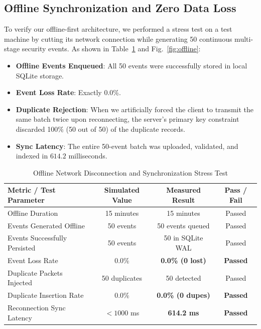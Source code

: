 \documentclass[conference]{IEEEtran}
\begin{document}
\subsection{Offline Synchronization and Zero Data Loss}
To verify our offline-first architecture, we performed a stress test on a test machine by cutting its network connection while generating 50 continuous multi-stage security events. 
As shown in Table~\ref{tab:offline_results} and Fig.~\ref{fig:offline}:
\begin{itemize}
    \item \textbf{Offline Events Enqueued}: All 50 events were successfully stored in local SQLite storage.
    \item \textbf{Event Loss Rate}: Exactly 0.0\%.
    \item \textbf{Duplicate Rejection}: When we artificially forced the client to transmit the same batch twice upon reconnecting, the server's primary key constraint discarded 100\% (50 out of 50) of the duplicate records.
    \item \textbf{Sync Latency}: The entire 50-event batch was uploaded, validated, and indexed in $614.2$ milliseconds.
\end{itemize}

\begin{table}[h]
\caption{Offline Network Disconnection and Synchronization Stress Test}
\label{tab:offline_results}
\centering
\begin{tabular}{@{}lccc@{}}
\toprule
\textbf{Metric / Test Parameter} & \textbf{Simulated Value} & \textbf{Measured Result} & \textbf{Pass / Fail} \\
\midrule
Offline Duration & 15 minutes & 15 minutes & Passed \\
Events Generated Offline & 50 events & 50 events queued & Passed \\
Events Successfully Persisted & 50 events & 50 in SQLite WAL & Passed \\
Event Loss Rate & 0.0\% & \textbf{0.0\% (0 lost)} & \textbf{Passed} \\
Duplicate Packets Injected & 50 duplicates & 50 detected & Passed \\
Duplicate Insertion Rate & 0.0\% & \textbf{0.0\% (0 dupes)} & \textbf{Passed} \\
Reconnection Sync Latency & $<1000$ ms & \textbf{614.2 ms} & \textbf{Passed} \\
\bottomrule
\end{tabular}
\end{table}
\end{document}
